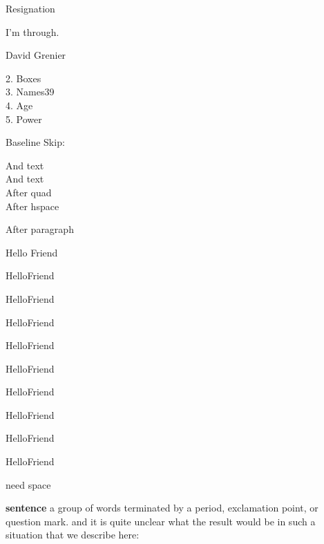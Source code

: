\documentclass[draft,12pt,twocolumn]{article}
\begin{document}
\begin{titlepage}
    \onecolumn

    \centerline{Resignation}

    \vfill

    I'm through.

    \vfill

    \hfill David Grenier
\end{titlepage}

\twocolumn

2. Boxes\\
3. Names\hfill39\\
4. Age\\
5. Power

Baseline Skip: \the\baselineskip

And text\\
And text\\
\qquad After quad\\
\hspace*{2em}After hspace\par
After paragraph

\medskip

Hello Friend\par
Hello\quad{}Friend\par
Hello\quad Friend\par
Hello\hspace{1em}Friend\par
Hello\qquad Friend\par
Hello\hspace{2em}Friend\par
Hello\hspace{12pt}Friend\par
Hello\hspace{.5in}Friend\par
Hello\hspace{1.5cm}Friend\par
Hello\hspace{-50pt}Friend

\medskip

\textbar need space\textbar\par
\textbar\phantom{need space}\textbar

\medskip

\setlength{\hangindent}{30pt}
\setlength{\hangafter}{2}
\noindent
\textbf{sentence} a group of words terminated by
a period, exclamation point, or question mark.
and it is quite unclear what the result would be
in such a situation that we describe here:
\end{document}
